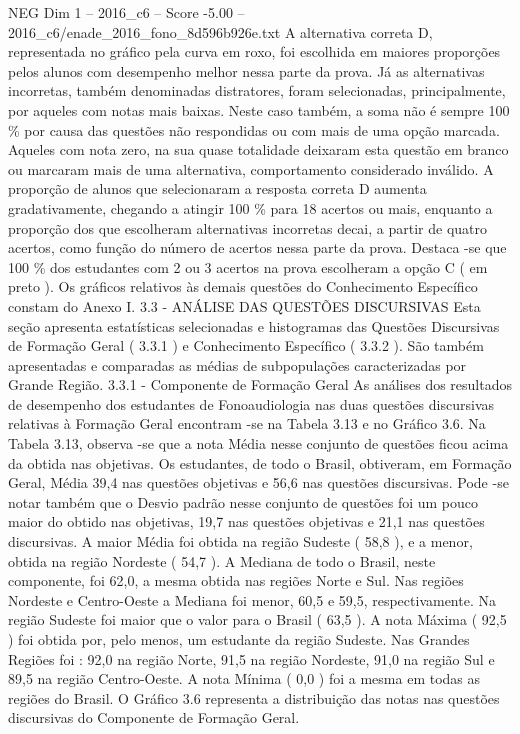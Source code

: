 \begin{textsample}{NEG Dim 1 – 2016\_c6 – Score -5.00 – 2016\_c6/enade\_2016\_fono\_8d596b926e.txt}
A alternativa correta D, representada no gráfico pela curva em roxo, foi escolhida em maiores proporções pelos alunos com desempenho melhor nessa parte da prova.
Já as alternativas incorretas, também denominadas distratores, foram selecionadas, principalmente, por aqueles com notas mais baixas.
Neste caso também, a soma não é sempre 100 \% por causa das questões não respondidas ou com mais de uma opção marcada.
Aqueles com nota zero, na sua quase totalidade deixaram esta questão em branco ou marcaram mais de uma alternativa, comportamento considerado inválido.
A proporção de alunos que selecionaram a resposta correta D aumenta gradativamente, chegando a atingir 100 \% para 18 acertos ou mais, enquanto a proporção dos que escolheram alternativas incorretas decai, a partir de quatro acertos, como função do número de acertos nessa parte da prova.
Destaca -se que 100 \% dos estudantes com 2 ou 3 acertos na prova escolheram a opção C ( em preto ).
Os gráficos relativos às demais questões do Conhecimento Específico constam do Anexo I. 3.3 - ANÁLISE DAS QUESTÕES DISCURSIVAS Esta seção apresenta estatísticas selecionadas e histogramas das Questões Discursivas de Formação Geral ( 3.3.1 ) e Conhecimento Específico ( 3.3.2 ).
São também apresentadas e comparadas as médias de subpopulações caracterizadas por Grande Região. 3.3.1 - Componente de Formação Geral As análises dos resultados de desempenho dos estudantes de Fonoaudiologia nas duas questões discursivas relativas à Formação Geral encontram -se na Tabela 3.13 e no Gráfico 3.6.
Na Tabela 3.13, observa -se que a nota Média nesse conjunto de questões ficou acima da obtida nas objetivas.
Os estudantes, de todo o Brasil, obtiveram, em Formação Geral, Média 39,4 nas questões objetivas e 56,6 nas questões discursivas.
Pode -se notar também que o Desvio padrão nesse conjunto de questões foi um pouco maior do obtido nas objetivas, 19,7 nas questões objetivas e 21,1 nas questões discursivas.
A maior Média foi obtida na região Sudeste ( 58,8 ), e a menor, obtida na região Nordeste ( 54,7 ).
A Mediana de todo o Brasil, neste componente, foi 62,0, a mesma obtida nas regiões Norte e Sul.
Nas regiões Nordeste e Centro-Oeste a Mediana foi menor, 60,5 e 59,5, respectivamente.
Na região Sudeste foi maior que o valor para o Brasil ( 63,5 ).
A nota Máxima ( 92,5 ) foi obtida por, pelo menos, um estudante da região Sudeste.
Nas Grandes Regiões foi : 92,0 na região Norte, 91,5 na região Nordeste, 91,0 na região Sul e 89,5 na região Centro-Oeste.
A nota Mínima ( 0,0 ) foi a mesma em todas as regiões do Brasil.
O Gráfico 3.6 representa a distribuição das notas nas questões discursivas do Componente de Formação Geral.

\end{textsample}
